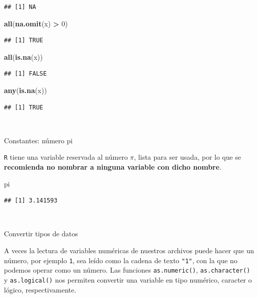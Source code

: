 \documentclass[11pt,]{book}
\newenvironment{Shaded}{\begin{snugshade}}{\end{snugshade}}
\newcommand{\DecValTok}[1]{\textcolor[rgb]{0.06,0.06,0.06}{#1}}
\newcommand{\KeywordTok}[1]{\textcolor[rgb]{0.27,0.27,0.27}{\textbf{#1}}}
\newcommand{\NormalTok}[1]{#1}
\newcommand{\OperatorTok}[1]{\textcolor[rgb]{0.43,0.43,0.43}{\textbf{#1}}}
\newcommand{\StringTok}[1]{\textcolor[rgb]{0.5,0.5,0.5}{#1}}
\begin{document}
\begin{verbatim}
## [1] NA
\end{verbatim}

\begin{Shaded}
\begin{Highlighting}[]
\KeywordTok{all}\NormalTok{(}\KeywordTok{na.omit}\NormalTok{(x) }\OperatorTok{>}\StringTok{ }\DecValTok{0}\NormalTok{)}
\end{Highlighting}
\end{Shaded}

\begin{verbatim}
## [1] TRUE
\end{verbatim}

\begin{Shaded}
\begin{Highlighting}[]
\KeywordTok{all}\NormalTok{(}\KeywordTok{is.na}\NormalTok{(x))}
\end{Highlighting}
\end{Shaded}

\begin{verbatim}
## [1] FALSE
\end{verbatim}

\begin{Shaded}
\begin{Highlighting}[]
\KeywordTok{any}\NormalTok{(}\KeywordTok{is.na}\NormalTok{(x))}
\end{Highlighting}
\end{Shaded}

\begin{verbatim}
## [1] TRUE
\end{verbatim}

~

Constantes: número pi

\texttt{R} tiene una variable reservada al número \(\pi\), lista para ser usada, por lo que se \textbf{recomienda no nombrar a ninguna variable con dicho nombre}.

\begin{Shaded}
\begin{Highlighting}[]
\NormalTok{pi}
\end{Highlighting}
\end{Shaded}

\begin{verbatim}
## [1] 3.141593
\end{verbatim}

~

Convertir tipos de datos

A veces la lectura de variables numéricas de nuestros archivos puede hacer que un número, por ejemplo \texttt{1}, sea leído como la cadena de texto \texttt{"1"}, con la que no podemos operar como un número. Las funciones \texttt{as.numeric()}, \texttt{as.character()} y \texttt{as.logical()} nos permiten convertir una variable en tipo numérico, caracter o lógico, respectivamente.
\end{document}
